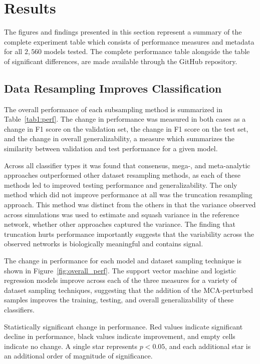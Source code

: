 \documentclass[10pt]{SelfArx} %
\begin{document}
\section*{Results}

The figures and findings presented in this section represent a summary of the complete experiment table which consists
of performance measures and metadata for all $2,560$ models tested. The complete performance table alongside the table
of significant differences, are made available through the GitHub repository.

\subsection*{Data Resampling Improves Classification}

The overall performance of each subsampling method is summarized in Table~\ref{tab1:perf}. The change in performance was
measured in both cases as a change in F1 score on the validation set, the change in F1 score on the test set, and the
change in overall generalizability, a measure which summarizes the similarity between validation and test performance
for a given model. 

Across all classifier types it was found that consensus, mega-, and meta-analytic approaches outperformed other dataset
resampling methods, as each of these methods led to improved testing performance and generalizability. The only method
which did not improve performance at all was the truncation resampling approach. This method was distinct from the
others in that the variance observed across simulations was used to estimate and squash variance in the reference
network, whether other approaches captured the variance. The finding that truncation hurts performance importantly
suggests that the variability across the observed networks is biologically meaningful and contains signal.

The change in performance for each model and dataset sampling technique is
shown in Figure~\ref{fig:overall_perf}. The support vector machine and
logistic regression models improve across each of the three measures for a
variety of dataset sampling techniques, suggesting that the addition of the
MCA-perturbed samples improves the training, testing, and overall
generalizability of these classifiers.

\begin{table}[b!]
\centering
\caption{Statistically significant change in performance. Red values indicate significant
decline in performance, black values indicate improvement, and empty cells indicate no change. A single star
represents $p < 0.05$, and each additional star is an additional order of magnitude of significance.}
\label{tab1:perf}
\small

\end{table}
\end{document}
